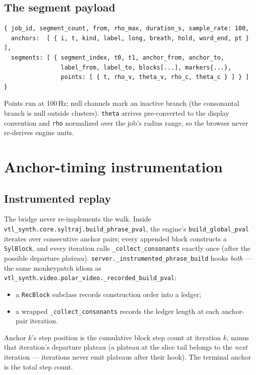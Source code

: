 \documentclass[11pt,a4paper]{article}
\begin{document}
\subsection{The segment payload}

\begin{verbatim}
{ job_id, segment_count, from, rho_max, duration_s, sample_rate: 100,
  anchors:  [ { i, t, kind, label, long, breath, hold, word_end, pt } ],
  segments: [ { segment_index, t0, t1, anchor_from, anchor_to,
                label_from, label_to, blocks[...], markers{...},
                points: [ { t, rho_v, theta_v, rho_c, theta_c } ] } ] }
\end{verbatim}

Points run at 100\,Hz; null channels mark an inactive branch
(the consonantal branch is null outside clusters). \texttt{theta} arrives
pre-converted to the display convention and \texttt{rho} normalized over
the job's radius range, so the browser never re-derives engine units.

\section{Anchor-timing instrumentation}

\subsection{Instrumented replay}

The bridge never re-implements the walk. Inside
\texttt{vtl\_synth.core.syltraj.build\_phrase\_pval}, the engine's
\texttt{build\_global\_pval} iterates over consecutive anchor pairs;
every appended block constructs a \texttt{SylBlock}, and every iteration
calls \texttt{\_collect\_consonants} exactly once (after the possible
departure plateau). \texttt{server.\_instrumented\_phrase\_build} hooks
\emph{both} --- the same monkeypatch idiom as
\texttt{vtl\_synth.video.polar\_video.\_recorded\_build\_pval}:

\begin{itemize}
\item a \texttt{RecBlock} subclass records construction order into a
  ledger;
\item a wrapped \texttt{\_collect\_consonants} records the ledger length
  at each anchor-pair iteration.
\end{itemize}

Anchor $k$'s step position is the cumulative block step count at
iteration $k$, minus that iteration's departure plateau (a plateau at the
slice tail belongs to the \emph{next} iteration --- iterations never emit
plateaus after their hook). The terminal anchor is the total step count.
\end{document}
